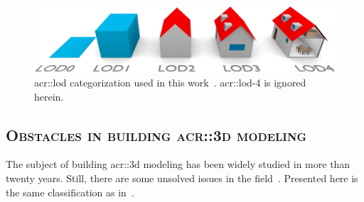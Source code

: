             \begin{figure}[htpb]
                \centering
                \includegraphics[width=.7\textwidth]{images/introduction/lods}            
                \caption{
                    \label{fig::lods} \gls{acr::lod} categorization used in this work~\parencite{biljecki2016improved}.
                    \gls{acr::lod}-4 is ignored herein.
                }
            \end{figure}
    \subsection{\textsc{Obstacles in building \texorpdfstring{\gls*{acr::3d}}{3D} modeling}}
        \label{subsec::introduction::urban_3d_reconstruction::challenges}
        The subject of building \gls{acr::3d} modeling has been widely studied in more than twenty years.
        Still, there are some unsolved issues in the field~\parencite{musialski2013survey, lafarge2015some}.
        Presented here is the same classification as in~\textcite{lafarge2015some}.

